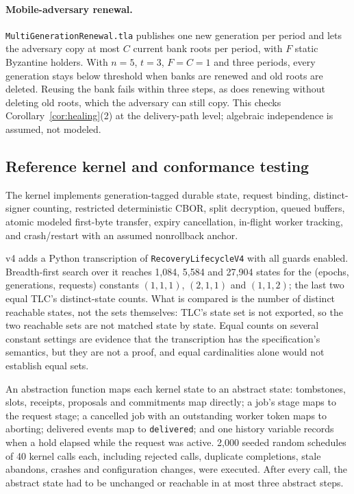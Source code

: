 \documentclass[pdflatex,sn-mathphys-num,twocolumn]{sn-jnl}
\theoremstyle{plain}
\theoremstyle{definition}
\newcommand{\code}[1]{\texttt{#1}}
\begin{document}
\paragraph{Mobile-adversary renewal.}
\code{MultiGenerationRenewal.tla} publishes one new generation per period and lets the adversary copy at most $C$ current bank roots per period, with $F$ static Byzantine holders. With $n=5$, $t=3$, $F=C=1$ and three periods, every generation stays below threshold when banks are renewed and old roots are deleted. Reusing the bank fails within three steps, as does renewing without deleting old roots, which the adversary can still copy. This checks Corollary~\ref{cor:healing}(2) at the delivery-path level; algebraic independence is assumed, not modeled.

\subsection{Reference kernel and conformance testing}
The kernel implements generation-tagged durable state, request binding, distinct-signer counting, restricted deterministic CBOR, split decryption, queued buffers, atomic modeled first-byte transfer, expiry cancellation, in-flight worker tracking, and crash/restart with an assumed nonrollback anchor.

v4 adds a Python transcription of \code{RecoveryLifecycleV4} with all guards enabled. Breadth-first search over it reaches 1,084, 5,584 and 27,904 states for the (epochs, generations, requests) constants $(1,1,1)$, $(2,1,1)$ and $(1,1,2)$; the last two equal TLC's distinct-state counts. What is compared is the number of distinct reachable states, not the sets themselves: TLC's state set is not exported, so the two reachable sets are not matched state by state. Equal counts on several constant settings are evidence that the transcription has the specification's semantics, but they are not a proof, and equal cardinalities alone would not establish equal sets.

An abstraction function maps each kernel state to an abstract state: tombstones, slots, receipts, proposals and commitments map directly; a job's stage maps to the request stage; a cancelled job with an outstanding worker token maps to aborting; delivered events map to \code{delivered}; and one history variable records when a hold elapsed while the request was active. 2,000 seeded random schedules of 40 kernel calls each, including rejected calls, duplicate completions, stale abandons, crashes and configuration changes, were executed. After every call, the abstract state had to be unchanged or reachable in at most three abstract steps.
\end{document}
